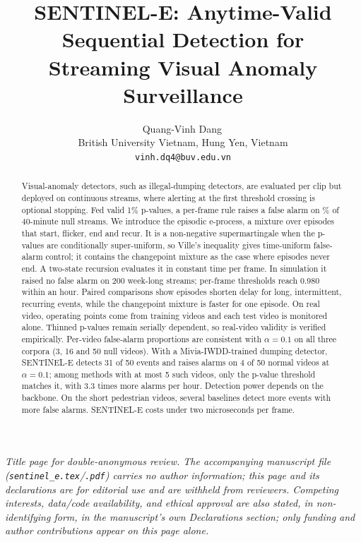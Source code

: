 \documentclass[11pt,a4paper]{article}
\title{\textbf{SENTINEL-E}: Anytime-Valid Sequential Detection for\\
       Streaming Visual Anomaly Surveillance}
\author{%
  Quang-Vinh Dang\,\orcidlink{0000-0002-3877-8024}\\[2pt]
  \small British University Vietnam, Hung Yen, Vietnam\\
  \small \texttt{vinh.dq4@buv.edu.vn}
}
\date{}
\begin{document}
\maketitle
\thispagestyle{empty}

\begin{center}
  \small\emph{Title page for double-anonymous review. The accompanying
  manuscript file (\texttt{sentinel\_e.tex}/\texttt{.pdf}) carries no author
  information; this page and its declarations are for editorial use and are
  withheld from reviewers. Competing interests, data/code availability, and
  ethical approval are also stated, in non-identifying form, in the
  manuscript's own Declarations section; only funding and author
  contributions appear on this page alone.}
\end{center}
\vspace{1em}

\begin{abstract}
\noindent
Visual-anomaly detectors, such as illegal-dumping detectors, are evaluated per clip but deployed on continuous streams, where alerting at the first threshold crossing is optional stopping. Fed valid 1\% p-values, a per-frame rule raises a false alarm on \ValidityPfaPvaluePct\% of 40-minute null streams. We introduce the episodic e-process, a mixture over episodes that start, flicker, end and recur. It is a non-negative supermartingale when the p-values are conditionally super-uniform, so Ville's inequality gives time-uniform false-alarm control; it contains the changepoint mixture as the case where episodes never end. A two-state recursion evaluates it in constant time per frame. In simulation it raised no false alarm on 200 week-long streams; per-frame thresholds reach 0.980 within an hour. Paired comparisons show episodes shorten delay for long, intermittent, recurring events, while the changepoint mixture is faster for one episode. On real video, operating points come from training videos and each test video is monitored alone. Thinned p-values remain serially dependent, so real-video validity is verified empirically. Per-video false-alarm proportions are consistent with $\alpha=0.1$ on all three corpora (3, 16 and 50 null videos). With a Mivia-IWDD-trained dumping detector, SENTINEL-E detects 31 of 50 events and raises alarms on 4 of 50 normal videos at $\alpha=0.1$; among methods with at most 5 such videos, only the p-value threshold matches it, with 3.3 times more alarms per hour. Detection power depends on the backbone. On the short pedestrian videos, several baselines detect more events with more false alarms. SENTINEL-E costs under two microseconds per frame.
\end{abstract}
\end{document}
